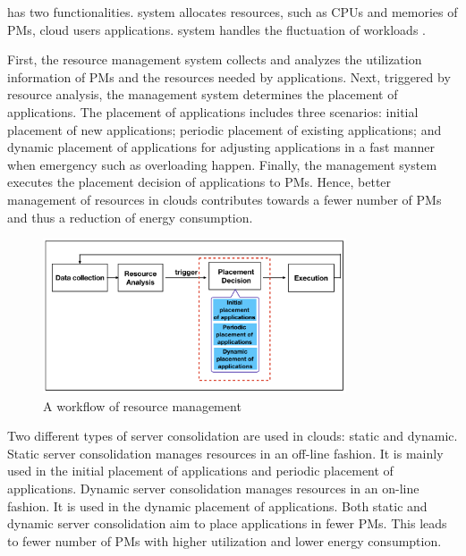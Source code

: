 has two  functionalities.  system 
allocates resources, such as CPUs and memories of PMs,  cloud users  applications.  system 
handles the fluctuation of workloads .  

First, the resource management system collects and analyzes the utilization information of PMs and the resources needed by applications. Next, triggered by resource analysis, the management system determines the 
placement of applications. The placement of applications includes three scenarios: initial placement of new applications; periodic placement of existing applications; 
and dynamic placement of applications for adjusting applications in a fast manner when emergency such as overloading happen. Finally, 
the management system executes the placement decision of applications to PMs. Hence, better management of resources 
in clouds contributes towards a fewer number of PMs and thus a reduction of energy consumption.



\begin{figure}
	\centering
	\includegraphics[width=0.8\textwidth]{pics/workflow_management.png}
	\caption{A workflow of resource management \cite{Mishra:2012kx}}
	\label{fig:workflow}
\end{figure}



 Two different types of
server consolidation are used in clouds: static and dynamic. Static server consolidation manages resources in an off-line fashion. It is mainly 
used in the initial placement of applications and periodic placement of applications. Dynamic server consolidation manages resources in 
an on-line fashion. It is used in the dynamic placement of applications. Both static and dynamic server consolidation aim to place
applications in fewer PMs. This leads to fewer number of PMs with higher utilization and lower energy consumption.



